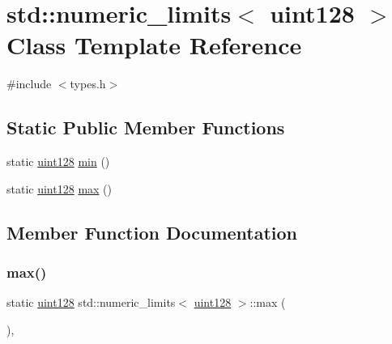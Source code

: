 \hypertarget{classstd_1_1numeric__limits_3_01uint128_01_4}{}\section{std\+:\+:numeric\+\_\+limits$<$ uint128 $>$ Class Template Reference}
\label{classstd_1_1numeric__limits_3_01uint128_01_4}


{\ttfamily \#include $<$types.\+h$>$}

\subsection*{Static Public Member Functions}
\begin{DoxyCompactItemize}
\item 
static \hyperlink{classuint128}{uint128} \hyperlink{classstd_1_1numeric__limits_3_01uint128_01_4_adef4934a87fb473dae963876142d84a9}{min} ()
\item 
static \hyperlink{classuint128}{uint128} \hyperlink{classstd_1_1numeric__limits_3_01uint128_01_4_a7093ce47008ca399ec2cd994099baa2a}{max} ()
\end{DoxyCompactItemize}


\subsection{Member Function Documentation}
\mbox{\label{classstd_1_1numeric__limits_3_01uint128_01_4_a7093ce47008ca399ec2cd994099baa2a}} 
\subsubsection{\texorpdfstring{max()}{max()}}
{\footnotesize\ttfamily static \hyperlink{classuint128}{uint128} std\+::numeric\+\_\+limits$<$ \hyperlink{classuint128}{uint128} $>$\+::max (\begin{DoxyParamCaption}{ }\end{DoxyParamCaption})\hspace{0.3cm}{\ttfamily [inline]}, {\ttfamily [static]}}

\mbox{\label{classstd_1_1numeric__limits_3_01uint128_01_4_adef4934a87fb473dae963876142d84a9}} 
